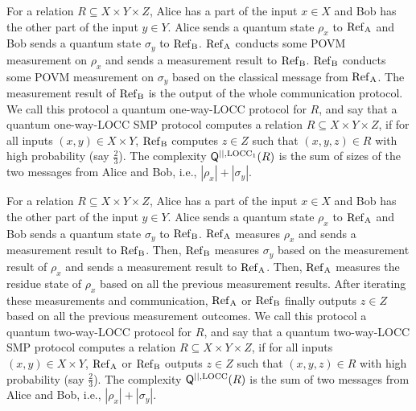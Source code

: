 \begin{definition}
    For a relation $R \subseteq X \times Y \times Z$, Alice has a part of the input $x \in X$ and Bob has the other part of the input $y \in Y$. Alice sends a quantum state $\rho_x$ to $\rm{Ref}_A$ and Bob sends a quantum state $\sigma_y$ to $\rm{Ref}_B$. $\rm{Ref}_A$ conducts some POVM measurement on $\rho_x$ and sends a measurement result to $\rm{Ref}_B$. $\rm{Ref}_B$ conducts some POVM measurement on $\sigma_y$ based on the classical message from $\rm{Ref}_A$. The measurement result of $\rm{Ref}_B$ is the output of the whole communication protocol. We call this protocol a quantum one-way-LOCC protocol for $R$, and say that a quantum one-way-LOCC SMP protocol computes a relation $R \subseteq X \times Y \times Z$, if for all inputs $(x,y) \in X \times Y$, $\rm{Ref}_B$ computes $z \in Z$ such that $(x,y,z) \in R$ with high probability (say $\frac{2}{3}$). The complexity $\mathsf{Q}^{||,\mathrm{LOCC}_1}(R)$ is the sum of sizes of the two messages from Alice and Bob, i.e., $|\rho_x|+|\sigma_y|$.
\end{definition}

\begin{definition}
    For a relation $R \subseteq X \times Y \times Z$, Alice has a part of the input $x \in X$ and Bob has the other part of the input $y \in Y$. Alice sends a quantum state $\rho_x$ to $\rm{Ref}_A$ and Bob sends a quantum state $\sigma_y$ to $\rm{Ref}_B$. $\rm{Ref}_A$ measures $\rho_x$ and sends a measurement result to $\rm{Ref}_B$. Then, $\rm{Ref}_B$ measures $\sigma_y$ based on the measurement result of $\rho_x$ and sends a measurement result to $\rm{Ref}_A$. Then, $\rm{Ref}_A$ measures the residue state of $\rho_x$ based on all the previous measurement results. After iterating these measurements and communication, $\rm{Ref}_A$ or $\rm{Ref}_B$ finally outputs $z \in Z$ based on all the previous measurement outcomes. We call this protocol a quantum two-way-LOCC protocol for $R$, and say that a quantum two-way-LOCC SMP protocol computes a relation $R \subseteq X \times Y \times Z$, if for all inputs $(x,y) \in X \times Y$,  $\rm{Ref}_A$ or $\rm{Ref}_B$ outputs $z \in Z$ such that $(x,y,z) \in R$ with high probability (say $\frac{2}{3}$). The complexity $\mathsf{Q}^{||,\mathrm{LOCC}}(R)$ is the sum of two messages from Alice and Bob, i.e., $|\rho_x|+|\sigma_y|$.
\end{definition}


